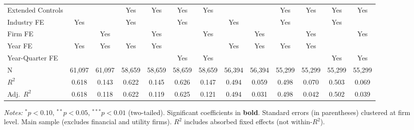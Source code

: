 \begin{landscape}
\begin{table}[H]
\begin{tabular}{lcccccccccccc}
\midrule
Extended Controls &  &  & Yes & Yes & Yes & Yes &  &  & Yes & Yes & Yes & Yes \\
Industry FE & Yes &  & Yes &  & Yes &  & Yes &  & Yes &  & Yes &  \\
Firm FE &  & Yes &  & Yes &  & Yes &  & Yes &  & Yes &  & Yes \\
Year FE & Yes & Yes & Yes & Yes &  &  & Yes & Yes & Yes & Yes &  &  \\
Year-Quarter FE &  &  &  &  & Yes & Yes &  &  &  &  & Yes & Yes \\
\midrule
N & 61,097 & 61,097 & 58,659 & 58,659 & 58,659 & 58,659 & 56,394 & 56,394 & 55,299 & 55,299 & 55,299 & 55,299 \\
$R^2$ & 0.618 & 0.143 & 0.622 & 0.145 & 0.626 & 0.147 & 0.494 & 0.059 & 0.498 & 0.070 & 0.503 & 0.069 \\
Adj.~$R^2$ & 0.618 & 0.118 & 0.622 & 0.119 & 0.625 & 0.121 & 0.494 & 0.031 & 0.498 & 0.042 & 0.502 & 0.039 \\
\bottomrule
\end{tabular}
\begin{minipage}{\linewidth}
\vspace{2pt}\scriptsize
\textit{Notes:} $^{*}p<0.10$, $^{**}p<0.05$, $^{***}p<0.01$ (two-tailed).
 Significant coefficients in \textbf{bold}.
 Standard errors (in parentheses) clustered at firm level.
 Main sample (excludes financial and utility firms).
 $R^2$ includes absorbed fixed effects (not within-$R^2$).
\end{minipage}
\end{table}
\end{landscape}